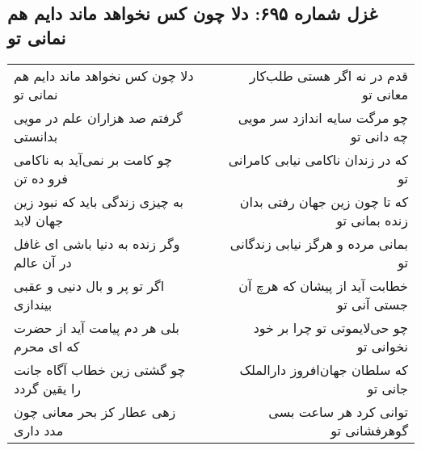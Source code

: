 \begin{center}
\section*{غزل شماره ۶۹۵: دلا چون کس نخواهد ماند دایم هم نمانی تو}
\label{sec:695}
\begin{longtable}{l p{0.5cm} r}
دلا چون کس نخواهد ماند دایم هم نمانی تو
&&
قدم در نه اگر هستی طلب‌کار معانی تو
\\
گرفتم صد هزاران علم در مویی بدانستی
&&
چو مرگت سایه اندازد سر مویی چه دانی تو
\\
چو کامت بر نمی‌آید به ناکامی فرو ده تن
&&
که در زندان ناکامی نیابی کامرانی تو
\\
به چیزی زندگی باید که نبود زین جهان لابد
&&
که تا چون زین جهان رفتی بدان زنده بمانی تو
\\
وگر زنده به دنیا باشی ای غافل در آن عالم
&&
بمانی مرده و هرگز نیابی زندگانی تو
\\
اگر تو پر و بال دنیی و عقبی بیندازی
&&
خطابت آید از پیشان که هرچ آن جستی آنی تو
\\
بلی هر دم پیامت آید از حضرت که ای محرم
&&
چو حی‌لایموتی تو چرا بر خود نخوانی تو
\\
چو گشتی زین خطاب آگاه جانت را یقین گردد
&&
که سلطان جهان‌افروز دارالملک جانی تو
\\
زهی عطار کز بحر معانی چون مدد داری
&&
توانی کرد هر ساعت بسی گوهرفشانی تو
\\
\end{longtable}
\end{center}
